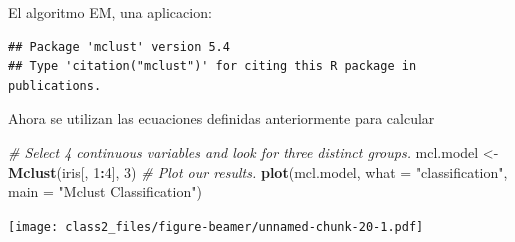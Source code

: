 \documentclass[ignorenonframetext,]{beamer}
\newenvironment{Shaded}{\begin{snugshade}}{\end{snugshade}}
\newcommand{\KeywordTok}[1]{\textcolor[rgb]{0.13,0.29,0.53}{\textbf{#1}}}
\newcommand{\DataTypeTok}[1]{\textcolor[rgb]{0.13,0.29,0.53}{#1}}
\newcommand{\DecValTok}[1]{\textcolor[rgb]{0.00,0.00,0.81}{#1}}
\newcommand{\StringTok}[1]{\textcolor[rgb]{0.31,0.60,0.02}{#1}}
\newcommand{\CommentTok}[1]{\textcolor[rgb]{0.56,0.35,0.01}{\textit{#1}}}
\newcommand{\OperatorTok}[1]{\textcolor[rgb]{0.81,0.36,0.00}{\textbf{#1}}}
\newcommand{\NormalTok}[1]{#1}
\begin{document}
\begin{frame}[fragile]

\begin{block}{El algoritmo EM, una aplicacion:}

\begin{verbatim}
## Package 'mclust' version 5.4
## Type 'citation("mclust")' for citing this R package in publications.
\end{verbatim}

Ahora se utilizan las ecuaciones definidas anteriormente para calcular

\begin{Shaded}
\begin{Highlighting}[]
\CommentTok{# Select 4 continuous variables and look for three distinct groups.}
\NormalTok{mcl.model <-}\StringTok{ }\KeywordTok{Mclust}\NormalTok{(iris[, }\DecValTok{1}\OperatorTok{:}\DecValTok{4}\NormalTok{], }\DecValTok{3}\NormalTok{)}
\CommentTok{# Plot our results.}
\KeywordTok{plot}\NormalTok{(mcl.model, }\DataTypeTok{what =} \StringTok{"classification"}\NormalTok{, }\DataTypeTok{main =} \StringTok{"Mclust Classification"}\NormalTok{)}
\end{Highlighting}
\end{Shaded}

\texttt{[image: class2\_files/figure-beamer/unnamed-chunk-20-1.pdf]}

\end{block}

\end{frame}
\end{document}
